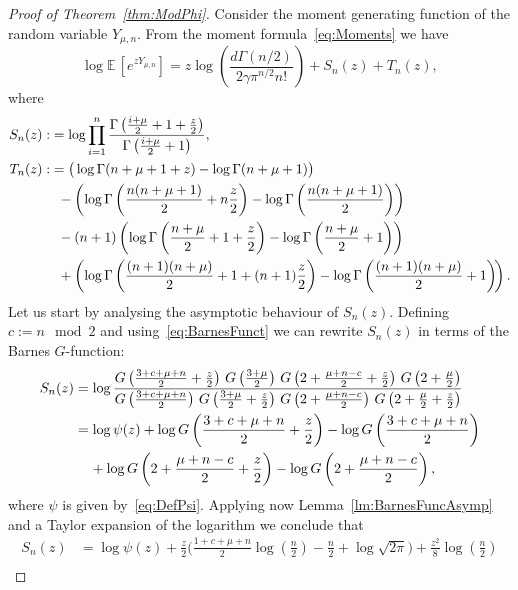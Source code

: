 \documentclass[10pt]{amsart}
\theoremstyle{definition}\newtheorem{defi}[theo]{Definition}\newtheorem{rema}[theo]{Remark}\newtheorem{exam}[theo]{Example}\newtheorem{exem}[theo]{Example}\newtheorem{nota}[theo]{Notation}
\newcommand{\EE}{\mathbb{E}\,}
\begin{document}
\begin{proof}[Proof of Theorem~\ref{thm:ModPhi}]
Consider the moment generating function of the random variable $Y_{\mu,n}$. From the moment formula~\eqref{eq:Moments} we have
\begin{equation}\label{eq:MomentGenartingFct}
\log \EE \left[e^{zY_{\mu,n}}\right] =z\log\left(\frac{d\Gamma(n/2)}{2\gamma\pi^{n/2}n!}\right)+S_n(z)+T_n(z),
\end{equation}
where
\begin{align*}
S_n(z):&=\log \prod\limits_{i=1}^n\frac{\Gamma\left(\frac{i+\mu}{2}+1+\frac{z}{2}\right)}{\Gamma\left(\frac{i+\mu}{2}+1\right)},\\
T_n(z):&=\big(\log\Gamma(n+\mu+1+z)-\log\Gamma(n+\mu+1)\big)\\
&\mkern10mu-\left(\log\Gamma\left(\frac{n(n+\mu+1)}{2}+n\frac{z}{2}\right)-\log\Gamma\left(\frac{n(n+\mu+1)}{2}\right)\right)\\
&\mkern10mu-(n+1)\left(\log \Gamma\left(\frac{n+\mu}{2}+1+\frac{z}{2}\right) -\log\Gamma\left(\frac{n+\mu}{2}+1\right)\right)\\
&\mkern10mu+\left(\log\Gamma\left(\frac{(n+1)(n+\mu)}{2}+1+(n+1)\frac{z}{2}\right)-\log \Gamma\left(\frac{(n+1)(n+\mu)}{2}+1\right)\!\right).
\end{align*}
Let us start by analysing the asymptotic behaviour of $S_n(z)$. Defining $c:= n\mod 2$ and using~\eqref{eq:BarnesFunct} we can rewrite $S_n(z)$ in terms of the Barnes $G$-function:
\begin{align*}
S_n(z)&=\log \frac{G\left(\frac{3+c+\mu+n}{2}+\frac{z}{2}\right)\,G\left(\frac{3+\mu}{2}\right)\,G\left(2+\frac{\mu+n-c}{2}+\frac{z}{2}\right)\,G\left(2+\frac{\mu}{2}\right)}{G\left(\frac{3+c+\mu+n}{2}\right)\,G\left(\frac{3+\mu}{2}+\frac{z}{2}\right)\,G\left(2+\frac{\mu+n-c}{2}\right)\,G\left(2+\frac{\mu}{2}+\frac{z}{2}\right)}\\
&=\log \psi(z)+ \log G\left(\frac{3+c+\mu+n}{2}+\frac{z}{2}\right) - \log G\left(\frac{3+c+\mu+n}{2}\right)\\
&\mkern20mu+\log G\left(2+\frac{\mu+n-c}{2}+\frac{z}{2}\right)-\log G\left(2+\frac{\mu+n-c}{2}\right),
\end{align*}
where $\psi$ is given by~\eqref{eq:DefPsi}. Applying now Lemma~\ref{lm:BarnesFuncAsymp} and a Taylor expansion of the logarithm we conclude that
\begin{align*}
S_n(z)&=\log \psi(z)+ \frac{z}{2}\bigg(\frac{1+c+\mu+n}{2}\log\left(\frac{n}{2}\right)-\frac{n}{2}+\log\sqrt{2\pi}\bigg)+\frac{z^2}{8}\log \left(\frac{n}{2}\right)\\

\end{align*}
\end{proof}
\end{document}
